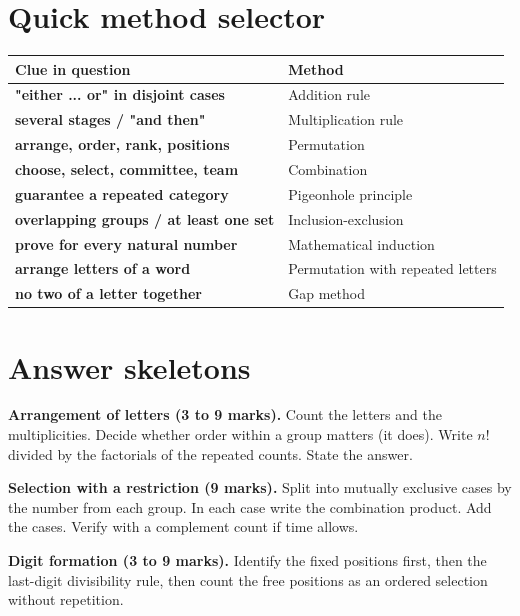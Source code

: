 \documentclass[11pt,a4paper]{article}
\begin{document}
\section{Quick method selector}

\begin{center}\small
\begin{tabularx}{\textwidth}{>{\bfseries}p{} X}
\toprule Clue in question & Method\\\midrule
"either ... or" in disjoint cases & Addition rule\\
several stages / "and then" & Multiplication rule\\
arrange, order, rank, positions & Permutation\\
choose, select, committee, team & Combination\\
guarantee a repeated category & Pigeonhole principle\\
overlapping groups / at least one set & Inclusion-exclusion\\
prove for every natural number & Mathematical induction\\
arrange letters of a word & Permutation with repeated letters\\
no two of a letter together & Gap method\\
\end{tabularx}
\end{center}

\section{Answer skeletons}

\begin{answerbox}
\textbf{Arrangement of letters (3 to 9 marks).} Count the letters and the multiplicities. Decide whether order within a group matters (it does). Write $n!$ divided by the factorials of the repeated counts. State the answer.
\end{answerbox}

\begin{answerbox}
\textbf{Selection with a restriction (9 marks).} Split into mutually exclusive cases by the number from each group. In each case write the combination product. Add the cases. Verify with a complement count if time allows.
\end{answerbox}

\begin{answerbox}
\textbf{Digit formation (3 to 9 marks).} Identify the fixed positions first, then the last-digit divisibility rule, then count the free positions as an ordered selection without repetition.
\end{answerbox}
\end{document}
